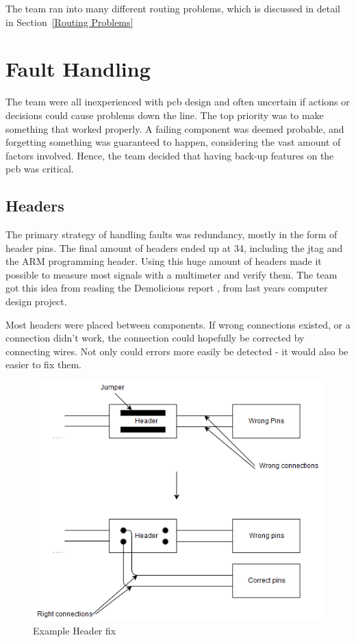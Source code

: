 The team ran into many different routing problems, which is discussed in detail in Section~\ref{Routing Problems}

\section{Fault Handling}
The team were all inexperienced with \gls{pcb} design and often uncertain if actions or decisions could cause problems down the line.
The top priority was to make something that worked properly.
A failing component was deemed probable, and forgetting something was guaranteed to happen, considering the vast amount of factors involved.
Hence, the team decided that having back-up features on the \gls{pcb} was critical.

\subsection{Headers}
The primary strategy of handling faults was redundancy, mostly in the form of header pins.
The final amount of headers ended up at 34, including the \gls{jtag} and the ARM programming header.
Using this huge amount of headers made it possible to measure most signals with a multimeter and verify them.
The team got this idea from reading the Demolicious report \cite{demolicious-report}, from last years computer design project.

Most headers were placed between components.
If wrong connections existed, or a connection didn't work, the connection could hopefully be corrected by connecting wires.
Not only could errors more easily be detected - it would also be easier to fix them.

\begin{figure}[h!]
\centering
\includegraphics[scale = 0.57]{images/Header_fix.png}
\caption{Example Header fix}
\label{fig:Header fix}
\end{figure}

